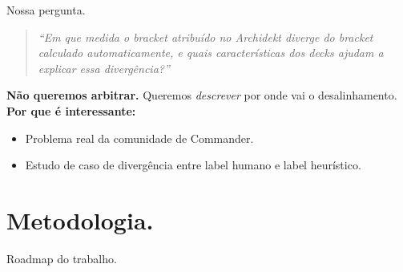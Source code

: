 \documentclass[aspectratio=149, dvipsnames]{beamer}
\begin{document}
\begin{frame}{Nossa pergunta.}
    \begin{quote}
        \large\textit{``Em que medida o bracket atribuído no Archidekt diverge do bracket calculado automaticamente, e quais características dos decks ajudam a explicar essa divergência?''}
    \end{quote}
    \bigskip
    \textbf{Não queremos arbitrar.} Queremos \textit{descrever} por onde vai o desalinhamento.
    \pause
    \bigskip
    \textbf{Por que é interessante:}
    \begin{itemize}
        \item Problema real da comunidade de Commander.
        \item Estudo de caso de divergência entre label humano e label heurístico.
    \end{itemize}
\end{frame}


\section{Metodologia.}

\begin{frame}[noframenumbering]{Roadmap do trabalho.}
\end{frame}
\end{document}
